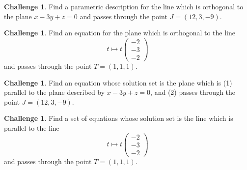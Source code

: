 \documentclass{tufte-book}
\theoremstyle{definition}
\newtheorem{challenge}[task]{Challenge}
\begin{document}
\begin{challenge}
Find a parametric description for the line which is orthogonal to the plane $x-3y+z=0$ and passes through the point $J = (12,3,-9)$.
\end{challenge}

\begin{challenge}
Find an equation for the plane which is orthogonal to the line 
\[
t\mapsto t \begin{pmatrix} -2\\-3\\-2\end{pmatrix}
\]
and passes through the point $T = (1,1,1)$.
\end{challenge}

\begin{challenge}
Find an equation whose solution set is the plane which is (1) parallel to the plane described by $x-3y+z=0$, and (2) passes through the point $J = (12,3,-9)$.
\end{challenge}

\begin{challenge}
Find a set of equations whose solution set is the line which is parallel to the line 
\[
t\mapsto t \begin{pmatrix} -2\\-3\\-2\end{pmatrix}
\]
and passes through the point $T = (1,1,1)$.
\end{challenge}



%
%
\end{document}
